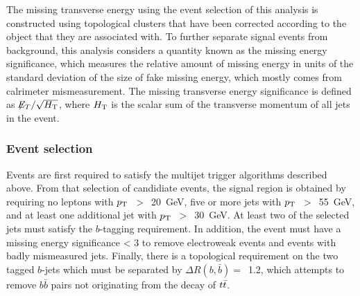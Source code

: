 
The missing transverse energy using the event selection of this analysis is constructed using topological clusters that have been corrected according to the object that they are associated with.
To further separate signal events from background, this analysis considers a quantity known as the missing energy significance, which measures the relative amount of missing energy in units of the standard deviation of the size of fake missing energy, which mostly comes from calrimeter mismeasurement.
The missing transverse energy significance is defined as $\not\!\!{E_{T}}/ \sqrt{H_{\mathrm{T}}}$, where $H_{\mathrm{T}}$ is the scalar sum of the transverse momentum of all jets in the event.



\subsubsection{Event selection}
\label{subsec:EvSel}

Events are first required to satisfy the multijet trigger algorithms described above.
From that selection of candidiate events, the signal region is obtained by requiring no leptons with $p_{\rm T}$~$>$~20~GeV, 
five or more jets with $p_{\rm T}$~$>$~55~GeV, and at least one additional jet with $p_{\rm T}$~$>$~30~GeV.
At least two of the selected jets must satisfy the $b$-tagging requirement.
In addition, the event must have a missing energy significance < 3 to remove electroweak events and events with badly mismeasured jets.
Finally, there is a topological requirement on the two tagged $b$-jets which must be separated by $\Delta R(b,\bar{b}) =$~1.2, 
which attempts to remove $b\bar{b}$ pairs not originating from the decay of $t\bar{t}$.

